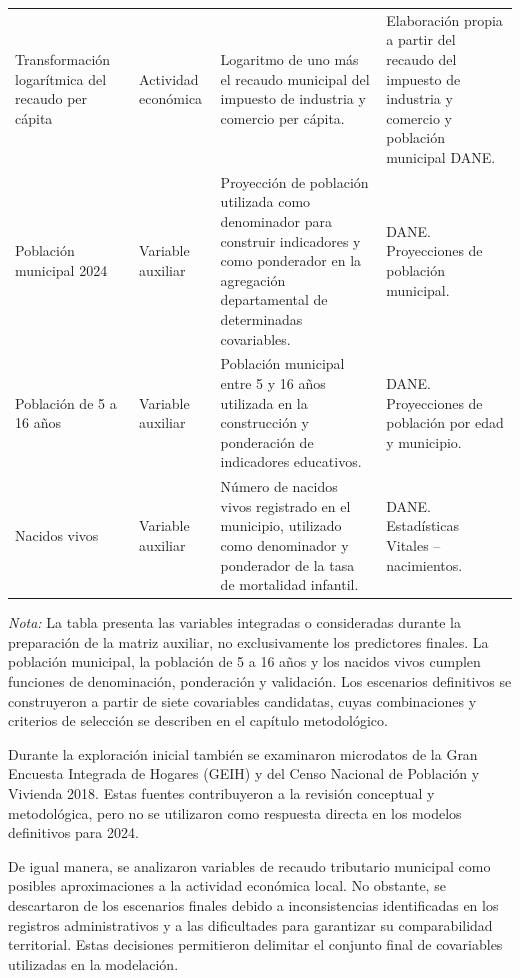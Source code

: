 \begin{longtable}{
>{\raggedright\arraybackslash}p{2.5cm}
>{\raggedright\arraybackslash}p{1.5cm}
>{\raggedright\arraybackslash}p{3.8cm}
>{\raggedright\arraybackslash}p{4.4cm}
}
Transformación logarítmica del recaudo per cápita
& Actividad económica
& Logaritmo de uno más el recaudo municipal del impuesto de industria y comercio per cápita.
& Elaboración propia a partir del recaudo del impuesto de industria y comercio y población municipal DANE. \\

Población municipal 2024
& Variable auxiliar
& Proyección de población utilizada como denominador para construir indicadores y como ponderador en la agregación departamental de determinadas covariables.
& DANE. Proyecciones de población municipal. \\

Población de 5 a 16 años
& Variable auxiliar
& Población municipal entre 5 y 16 años utilizada en la construcción y ponderación de indicadores educativos.
& DANE. Proyecciones de población por edad y municipio. \\

Nacidos vivos
& Variable auxiliar
& Número de nacidos vivos registrado en el municipio, utilizado como denominador y ponderador de la tasa de mortalidad infantil.
& DANE. Estadísticas Vitales -- nacimientos. \\

\end{longtable}
\endgroup

\begin{flushleft}
\footnotesize
\textit{Nota:} La tabla presenta las variables integradas o consideradas durante la preparación de la matriz auxiliar, no exclusivamente los predictores finales. La población municipal, la población de 5 a 16 años y los nacidos vivos cumplen funciones de denominación, ponderación y validación. Los escenarios definitivos se construyeron a partir de siete covariables candidatas, cuyas combinaciones y criterios de selección se describen en el capítulo metodológico.
\end{flushleft}

Durante la exploración inicial también se examinaron microdatos de la Gran Encuesta Integrada de Hogares (GEIH) y del Censo Nacional de Población y Vivienda 2018. Estas fuentes contribuyeron a la revisión conceptual y metodológica, pero no se utilizaron como respuesta directa en los modelos definitivos para 2024.

De igual manera, se analizaron variables de recaudo tributario municipal como posibles aproximaciones a la actividad económica local. No obstante, se descartaron de los escenarios finales debido a inconsistencias identificadas en los registros administrativos y a las dificultades para garantizar su comparabilidad territorial. Estas decisiones permitieron delimitar el conjunto final de covariables utilizadas en la modelación.

